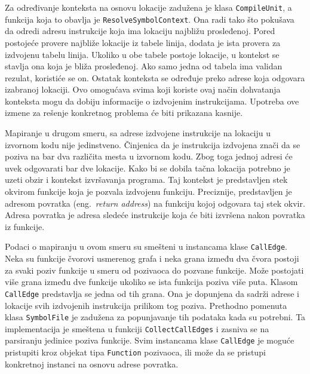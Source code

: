 \documentclass[12pt,oneside]{memoir}
\begin{document}
Za određivanje konteksta na osnovu lokacije zadužena je klasa \verb|CompileUnit|, a funkcija koja to obavlja je \verb|ResolveSymbolContext|.
Ona radi tako što pokušava da odredi adresu instrukcije koja ima lokaciju najbližu prosleđenoj.
Pored postojeće provere najbliže lokacije iz tabele linija, dodata je ista provera za izdvojenu tabelu linija.
Ukoliko u obe tabele postoje lokacije, u kontekst se stavlja ona koja je bliža prosleđenoj.
Ako samo jedna od tabela ima validan rezulat, koristiće se on.
Ostatak konteksta se određuje preko adrese koja odgovara izabranoj lokaciji.
Ovo omogućava svima koji koriste ovaj način dohvatanja konteksta mogu da dobiju informacije o izdvojenim instrukcijama.
Upotreba ove izmene za rešenje konkretnog problema će biti prikazana kasnije.

Mapiranje u drugom smeru, sa adrese izdvojene instrukcije na lokaciju u izvornom kodu nije jedinstveno.
Činjenica da je instrukcija izdvojena znači da se poziva na bar dva različita mesta u izvornom kodu.
Zbog toga jednoj adresi će uvek odgovarati bar dve lokacije. 
Kako bi se dobila tačna lokacija potrebno je uzeti obzir i kontekst izvršavanja programa.
Taj kontekst je predstavljen stek okvirom funkcije koja je pozvala izdvojenu funkciju.
Preciznije, predstavljen je adresom povratka (eng.~{\em return address}) na funkciju kojoj odgovara taj stek okvir.
Adresa povratka je adresa sledeće instrukcije koja će biti izvršena nakon povratka iz funkcije.

Podaci o mapiranju u ovom smeru su smešteni u instancama klase \verb|CallEdge|.
Neka su funkcije čvorovi usmerenog grafa i neka grana između dva čvora postoji za svaki poziv funkcije u smeru od pozivaoca do pozvane funkcije.
Može postojati više grana između dve funkcije ukoliko se ista funkcija poziva više puta.
Klasom \verb|CallEdge| predstavlja se jedna od tih grana.
Ona je dopunjena da sadrži adrese i lokacije svih izdvojenih instrukcija prilikom tog poziva.
Prethodno pomenuta klasa \verb|SymbolFile| je zadužena za popunjavanje tih podataka kada su potrebni.
Ta implementacija je smeštena u funkciji \verb|CollectCallEdges| i zasniva se na parsiranju jedinice poziva funkcije.
Svim instancama klase \verb|CallEdge| je moguće pristupiti kroz objekat tipa \verb|Function| pozivaoca, ili može da se pristupi konkretnoj instanci na osnovu adrese povratka.
\end{document}
